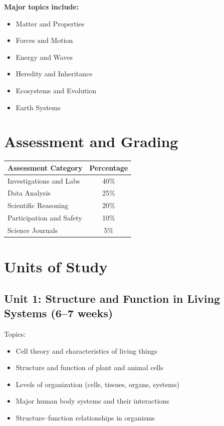 \documentclass[11pt,letterpaper]{report}
\begin{document}
\textbf{Major topics include:}
\begin{itemize}
    \item Matter and Properties
    \item Forces and Motion
    \item Energy and Waves
    \item Heredity and Inheritance
    \item Ecosystems and Evolution
    \item Earth Systems
\end{itemize}

\section{Assessment and Grading}

\begin{center}
\begin{tabular}{|l|c|}
\hline
\textbf{Assessment Category} & \textbf{Percentage} \\
\hline
Investigations and Labs & 40\% \\
\hline
Data Analysis & 25\% \\
\hline
Scientific Reasoning & 20\% \\
\hline
Participation and Safety & 10\% \\
\hline
Science Journals & 5\% \\
\hline
\end{tabular}
\end{center}

\section{Units of Study}

\subsection{Unit 1: Structure and Function in Living Systems (6–7 weeks)}

Topics:
\begin{itemize}
\item Cell theory and characteristics of living things
\item Structure and function of plant and animal cells
\item Levels of organization (cells, tissues, organs, systems)
\item Major human body systems and their interactions
\item Structure–function relationships in organisms
\end{itemize}
\end{document}

